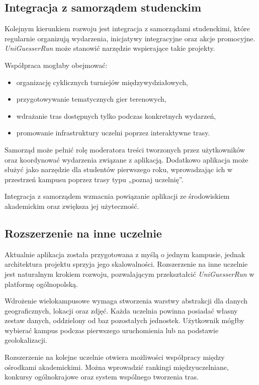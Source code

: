 \subsection{Integracja z samorządem studenckim}

Kolejnym kierunkiem rozwoju jest integracja z samorządami studenckimi, które regularnie organizują wydarzenia, inicjatywy integracyjne oraz akcje promocyjne. \textit{UniGuesserRun} może stanowić narzędzie wspierające takie projekty.

Współpraca mogłaby obejmować:
\begin{itemize}
    \item organizację cyklicznych turniejów międzywydziałowych,
    \item przygotowywanie tematycznych gier terenowych,
    \item wdrażanie tras dostępnych tylko podczas konkretnych wydarzeń,
    \item promowanie infrastruktury uczelni poprzez interaktywne trasy.
\end{itemize}

Samorząd może pełnić rolę moderatora treści tworzonych przez użytkowników oraz koordynować wydarzenia związane z aplikacją. Dodatkowo aplikacja może służyć jako narzędzie dla studentów pierwszego roku, wprowadzając ich w przestrzeń kampusu poprzez trasy typu „poznaj uczelnię”.

Integracja z samorządem wzmacnia powiązanie aplikacji ze środowiskiem akademickim oraz zwiększa jej użyteczność.

\subsection{Rozszerzenie na inne uczelnie}

Aktualnie aplikacja została przygotowana z myślą o jednym kampusie, jednak architektura projektu sprzyja jego skalowalności. Rozszerzenie na inne uczelnie jest naturalnym krokiem rozwoju, pozwalającym przekształcić \textit{UniGuesserRun} w platformę ogólnopolską.

Wdrożenie wielokampusowe wymaga stworzenia warstwy abstrakcji dla danych geograficznych, lokacji oraz zdjęć. Każda uczelnia powinna posiadać własny zestaw danych, oddzielony od baz pozostałych jednostek. Użytkownik mógłby wybierać kampus podczas pierwszego uruchomienia lub na podstawie geolokalizacji.

Rozszerzenie na kolejne uczelnie otwiera możliwości współpracy między ośrodkami akademickimi. Można wprowadzić rankingi międzyuczelniane, konkursy ogólnokrajowe oraz system wspólnego tworzenia tras.

